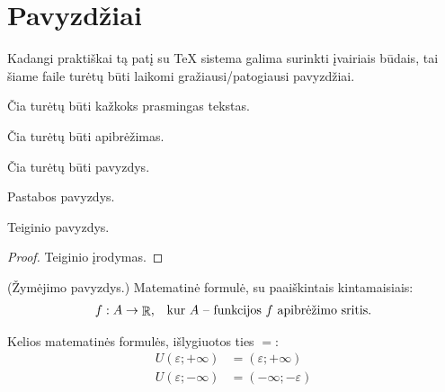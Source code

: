 \chapter{Pavyzdžiai}

Kadangi praktiškai tą patį su TeX sistema galima surinkti įvairiais
būdais, tai šiame faile turėtų būti laikomi gražiausi/patogiausi 
pavyzdžiai.

Čia turėtų būti kažkoks prasmingas tekstas.

\begin{defn}
  Čia turėtų būti apibrėžimas.
\end{defn}

\begin{exmp}[Pavyzdys]
  Čia turėtų būti pavyzdys.
\end{exmp}

\begin{note}
  Pastabos pavyzdys.
\end{note}

\begin{prop}
  Teiginio pavyzdys.
  \begin{proof}
    Teiginio įrodymas.
  \end{proof}
\end{prop}

\begin{notation}
  (Žymėjimo pavyzdys.)
  Matematinė formulė, su paaiškintais kintamaisiais:
  \[
  \begin{array}[]{c l}
    f : A \to \RSET, & \text{kur $A$ – funkcijos $f$ apibrėžimo sritis.}
  \end{array}
  \]
\end{notation}

Kelios matematinės formulės, išlygiuotos ties $=$:
\begin{align*}
  U(\varepsilon; +\infty) &= (\varepsilon; +\infty) \\
  U(\varepsilon; -\infty) &= (-\infty; -\varepsilon)
\end{align*}
